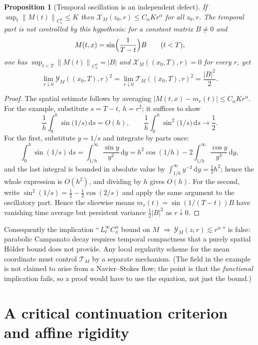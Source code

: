 \documentclass[11pt,reqno]{amsart}
\newcommand{\dd}{\,\mathrm{d}}
\newcommand{\norm}[1]{\left\lVert #1\right\rVert}
\newcommand{\abs}[1]{\left\lvert #1\right\rvert}
\newtheorem{proposition}[theorem]{Proposition}
\theoremstyle{definition}
\begin{document}
\begin{proposition}[Temporal oscillation is an independent defect]\label{prop:campanato}
If $\sup_{t}\norm{M(t)}_{C^\alpha_x}\le K$ then
$\mathcal X_M(z_0,r)\le C_\alpha Kr^\alpha$ for all $z_0,r$. The temporal part is not
controlled by this hypothesis: for a constant matrix $B\ne0$ and
\[
  M(t,x)=\sin\Bigl(\frac1{T-t}\Bigr)B\qquad(t<T),
\]
one has $\sup_{t<T}\norm{M(t)}_{C^\alpha_x}=\abs B$ and
$\mathcal X_M((x_0,T),r)=0$ for every $r$, yet
\[
  \lim_{r\downarrow0}\mathcal Y_M((x_0,T),r)^2
  =\lim_{r\downarrow0}\mathcal T_M((x_0,T),r)^2=\frac{\abs B^2}{2} .
\]
\end{proposition}

\begin{proof}
The spatial estimate follows by averaging
$\abs{M(t,x)-m_r(t)}\le C_\alpha Kr^\alpha$. For the example, substitute $s=T-t$,
$h=r^2$; it suffices to show
\[
  \frac1h\int_0^h\sin\bigl(1/s\bigr)\dd s=O(h),
  \qquad
  \frac1h\int_0^h\sin^2\bigl(1/s\bigr)\dd s\longrightarrow\frac12 .
\]
For the first, substitute $y=1/s$ and integrate by parts once:
\[
  \int_0^h\sin(1/s)\dd s=\int_{1/h}^\infty\frac{\sin y}{y^{2}}\dd y
  =h^{2}\cos(1/h)-2\int_{1/h}^\infty\frac{\cos y}{y^{3}}\dd y ,
\]
and the last integral is bounded in absolute value by
$\int_{1/h}^\infty y^{-3}\dd y=\tfrac12h^{2}$; hence the whole expression is $O(h^2)$, and
dividing by $h$ gives $O(h)$. For the second, write
$\sin^2(1/s)=\tfrac12-\tfrac12\cos(2/s)$ and apply the same argument to the oscillatory
part. Hence the slicewise means $m_r(t)=\sin(1/(T-t))B$ have vanishing time average but
persistent variance $\tfrac12\abs B^2$ as $r\downarrow0$.
\end{proof}

Consequently the implication
``\,$L^\infty_tC^\alpha_x$ bound on $M$ $\Rightarrow\ \mathcal Y_M(z,r)\lesssim
r^\alpha$\,'' is false: parabolic Campanato decay requires temporal compactness that a
purely spatial H\"older bound does not provide. Any local regularity scheme for the mean
coordinate must control $\mathcal T_M$ by a separate mechanism. (The field in the example
is not claimed to arise from a Navier--Stokes flow; the point is that the
\emph{functional} implication fails, so a proof would have to use the equation, not just
the bound.)

\section{A critical continuation criterion and affine rigidity}\label{sec:crit}
\end{document}
